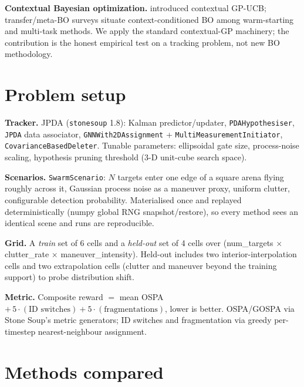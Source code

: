 \documentclass[11pt]{article}
\begin{document}
\textbf{Contextual Bayesian optimization.} \citet{krause2011} introduced
contextual GP-UCB; transfer/meta-BO surveys \citep{bai2023} situate
context-conditioned BO among warm-starting and multi-task methods. We
apply the standard contextual-GP machinery; the contribution is the
honest empirical test on a tracking problem, not new BO methodology.

\section{Problem setup}
\label{sec:setup}

\textbf{Tracker.} JPDA (\texttt{stonesoup} 1.8): Kalman
predictor/updater, \texttt{PDAHypothesiser}, \texttt{JPDA} data
associator, \texttt{GNNWith2DAssignment} +
\texttt{MultiMeasurementInitiator}, \texttt{CovarianceBasedDeleter}.
Tunable parameters: ellipsoidal gate size, process-noise scaling,
hypothesis pruning threshold (3-D unit-cube search space).

\textbf{Scenarios.} \texttt{SwarmScenario}: $N$ targets enter one edge
of a square arena flying roughly across it, Gaussian process noise as a
maneuver proxy, uniform clutter, configurable detection probability.
Materialised once and replayed deterministically (numpy global RNG
snapshot/restore), so every method sees an identical scene and runs are
reproducible.

\textbf{Grid.} A \emph{train} set of 6 cells and a \emph{held-out} set
of 4 cells over (num\_targets $\times$ clutter\_rate $\times$
maneuver\_intensity). Held-out includes two interior-interpolation cells
and two extrapolation cells (clutter and maneuver beyond the training
support) to probe distribution shift.

\textbf{Metric.} Composite reward $=$ mean OSPA $+\,5\cdot(\text{ID
switches}) + 5\cdot(\text{fragmentations})$, lower is better.
OSPA/GOSPA via Stone Soup's metric generators; ID switches and
fragmentation via greedy per-timestep nearest-neighbour assignment.

\section{Methods compared}
\end{document}
